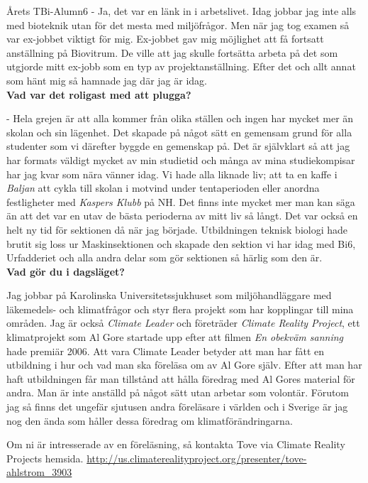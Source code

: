 \begin{news}{2}{Årets TBi-Alumn}{}{}{6}{}
 - Ja, det var en länk in i arbetslivet. Idag jobbar jag inte alls med bioteknik 
utan för det mesta med miljöfrågor. Men när jag tog examen så var ex-jobbet 
viktigt för mig. Ex-jobbet gav mig möjlighet att få fortsatt anställning på 
Biovitrum. De ville att jag skulle fortsätta arbeta på det som utgjorde mitt 
ex-jobb som en typ av projektanställning. Efter det och allt annat som hänt 
mig så hamnade jag där jag är idag. 
\\

\noindent \textbf{Vad var det roligast med att plugga?}

 - Hela grejen är att alla kommer från olika ställen och ingen har mycket mer än 
skolan och sin lägenhet. Det skapade på något sätt en gemensam grund för alla 
studenter som vi därefter byggde en gemenskap på. Det är självklart så att 
jag har formats väldigt mycket av min studietid och många av mina 
studiekompisar har jag kvar som nära vänner idag. Vi hade alla liknade liv; 
att ta en kaffe i \emph{Baljan} att cykla till skolan i motvind under tentaperioden 
eller anordna festligheter med \emph{Kaspers Klubb} på NH. Det finns inte mycket mer 
man kan säga än att det var en utav de bästa perioderna av mitt liv så långt. 
Det var också en helt ny tid för sektionen då när jag började. Utbildningen 
teknisk biologi hade brutit sig loss ur Maskinsektionen och skapade den 
sektion vi har idag med Bi6, Urfadderiet och alla andra delar som gör 
sektionen så härlig som den är.  
\\

\noindent \textbf{Vad gör du i dagsläget?}

Jag jobbar på Karolinska Universitetssjukhuset som miljöhandläggare med 
läkemedels- och klimatfrågor och styr flera projekt som har kopplingar till 
mina områden. Jag är också \emph{Climate Leader} och företräder \emph{Climate 
Reality Project}, ett klimatprojekt som Al Gore startade upp efter att filmen \emph{En 
obekväm sanning} hade premiär 2006. Att vara Climate Leader betyder att 
man har fått en utbildning i hur och vad man ska föreläsa om av Al Gore 
själv. Efter att man har haft utbildningen får man tillstånd att hålla 
föredrag med Al Gores material för andra. Man är inte anställd på något sätt 
utan arbetar som volontär. Förutom jag så finns det ungefär sjutusen andra 
föreläsare i världen och i Sverige är jag nog den ända som håller dessa 
föredrag om klimatförändringarna. 

Om ni är intresserade av en föreläsning, så kontakta Tove via Climate Reality 
Projects hemsida. \url{http://us.climaterealityproject.org/presenter/tove-
ahlstrom_3903}

\end{news}

